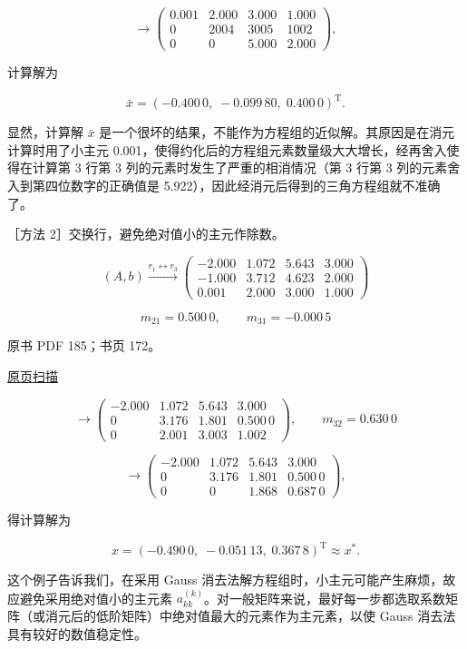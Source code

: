 \documentclass[
  10pt,
  fontset=fandol]{ctexart}
\begin{document}
\[
\longrightarrow\left(\begin{array}{rrr|r}
0.001&2.000&3.000&1.000\\
0&2004&3005&1002\\
0&0&5.000&2.000
\end{array}\right),
\]

计算解为

\[\bar{x}=(-0.400\,0,\;-0.099\,80,\;0.400\,0)^{\mathrm T}.\]

显然，计算解 \(\bar{x}\) 是一个很坏的结果，不能作为方程组的近似解。其原因是在消元计算时用了小主元 0.001，使得约化后的方程组元素数量级大大增长，经再舍入使得在计算第 3 行第 3 列的元素时发生了严重的相消情况（第 3 行第 3 列的元素舍入到第四位数字的正确值是 5.922），因此经消元后得到的三角方程组就不准确了。

［方法 2］交换行，避免绝对值小的主元作除数。

\[
(A,b)\xrightarrow{r_1\leftrightarrow r_3}
\left(\begin{array}{rrr|r}
-2.000&1.072&5.643&3.000\\
-1.000&3.712&4.623&2.000\\
0.001&2.000&3.000&1.000
\end{array}\right)
\]

\[m_{21}=0.500\,0,\qquad m_{31}=-0.000\,5\]

\clearpage

原书 PDF 185；书页 172。

\href{/Users/xiangjunfeng/Desktop/数值计算专用/numerical-analysis/book/source-images/pdf-185.jpeg}{原页扫描}

\[
\longrightarrow\left(\begin{array}{rrr|r}
-2.000&1.072&5.643&3.000\\
0&3.176&1.801&0.500\,0\\
0&2.001&3.003&1.002
\end{array}\right),\qquad m_{32}=0.630\,0
\]

\[
\longrightarrow\left(\begin{array}{rrr|r}
-2.000&1.072&5.643&3.000\\
0&3.176&1.801&0.500\,0\\
0&0&1.868&0.687\,0
\end{array}\right),
\]

得计算解为

\[x=(-0.490\,0,\;-0.051\,13,\;0.367\,8)^{\mathrm T}\approx x^*.\]

这个例子告诉我们，在采用 Gauss 消去法解方程组时，小主元可能产生麻烦，故应避免采用绝对值小的主元素 \(a_{kk}^{(k)}\)。对一般矩阵来说，最好每一步都选取系数矩阵（或消元后的低阶矩阵）中绝对值最大的元素作为主元素，以使 Gauss 消去法具有较好的数值稳定性。
\end{document}
